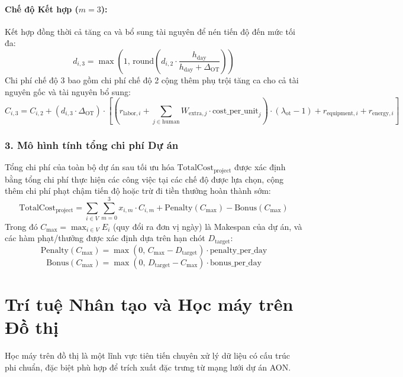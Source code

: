 \paragraph{Chế độ Kết hợp ($m=3$):}
Kết hợp đồng thời cả tăng ca và bổ sung tài nguyên để nén tiến độ đến mức tối đa:
\begin{equation}
    d_{i, 3} = \max\left(1, \, \text{round}\left( d_{i, 2} \cdot \frac{h_{\text{day}}}{h_{\text{day}} + \Delta_{\text{OT}}} \right)\right)
\end{equation}
Chi phí chế độ 3 bao gồm chi phí chế độ 2 cộng thêm phụ trội tăng ca cho cả tài nguyên gốc và tài nguyên bổ sung:
\begin{equation}
    C_{i, 3} = C_{i, 2} + (d_{i,3} \cdot \Delta_{\text{OT}}) \cdot \left[ \left( r_{\text{labor}, i} + \sum_{j \in \text{human}} W_{\text{extra}, j} \cdot \text{cost\_per\_unit}_j \right) \cdot (\lambda_{\text{ot}} - 1) + r_{\text{equipment}, i} + r_{\text{energy}, i} \right]
\end{equation}

\subsubsection{3. Mô hình tính tổng chi phí Dự án}
Tổng chi phí của toàn bộ dự án sau tối ưu hóa $\text{TotalCost}_{\text{project}}$ được xác định bằng tổng chi phí thực hiện các công việc tại các chế độ được lựa chọn, cộng thêm chi phí phạt chậm tiến độ hoặc trừ đi tiền thưởng hoàn thành sớm:
\begin{equation}
    \text{TotalCost}_{\text{project}} = \sum_{i \in V} \sum_{m=0}^3 x_{i,m} \cdot C_{i,m} + \text{Penalty}(C_{\text{max}}) - \text{Bonus}(C_{\text{max}})
\end{equation}
Trong đó $C_{\text{max}} = \max_{i \in V} E_i$ (quy đổi ra đơn vị ngày) là Makespan của dự án, và các hàm phạt/thưởng được xác định dựa trên hạn chót $D_{\text{target}}$:
\begin{equation}
    \text{Penalty}(C_{\text{max}}) = \max\left(0, \, C_{\text{max}} - D_{\text{target}}\right) \cdot \text{penalty\_per\_day}
\end{equation}
\begin{equation}
    \text{Bonus}(C_{\text{max}}) = \max\left(0, \, D_{\text{target}} - C_{\text{max}}\right) \cdot \text{bonus\_per\_day}
\end{equation}

\section{Trí tuệ Nhân tạo và Học máy trên Đồ thị}
Học máy trên đồ thị là một lĩnh vực tiên tiến chuyên xử lý dữ liệu có cấu trúc phi chuẩn, đặc biệt phù hợp để trích xuất đặc trưng từ mạng lưới dự án AON.

